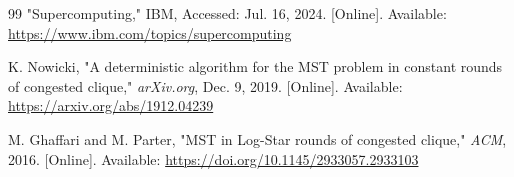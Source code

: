 \documentclass[english, 12pt, a4paper, elec, utf8, a-2b, online]{aaltothesis}
\begin{document}
\begin{thebibliography}{99}
	 "Supercomputing," IBM, Accessed: Jul. 16, 2024. [Online]. Available: \url{https://www.ibm.com/topics/supercomputing}

	 K. Nowicki, "A deterministic algorithm for the MST problem in constant rounds of congested clique," \textit{arXiv.org}, Dec. 9, 2019. [Online]. Available: \url{https://arxiv.org/abs/1912.04239}

	 M. Ghaffari and M. Parter, "MST in Log-Star rounds of congested clique," \textit{ACM}, 2016. [Online]. Available: \url{https://doi.org/10.1145/2933057.2933103}
\end{thebibliography}
\end{document}
